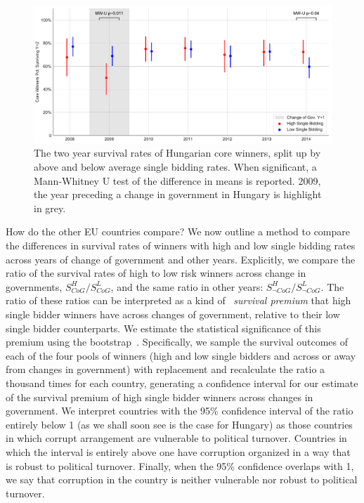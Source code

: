\begin{figure}
\centering
  \includegraphics[width=\textwidth]{images/ted_networks/hu_cog_core.pdf}
  \caption[Hungarian procurement market turnover]{The two year survival rates of Hungarian core winners, split up by above and below average single bidding rates. When significant, a Mann-Whitney U test of the difference in means is reported. 2009, the year preceding a change in government in Hungary is highlight in grey.}
  \label{fig:hu_core_turnover}
\end{figure}

How do the other EU countries compare? We now outline a method to compare the differences in survival rates of winners with high and low single bidding rates across years of change of government and other years. Explicitly, we compare the ratio of the survival rates of high to low risk winners across change in governments, $S_{CoG}^{H}/S_{CoG}^{L}$, and the same ratio in other years: $S_{\lnot CoG}^{H}/S_{\lnot CoG}^{L}$. The ratio of these ratios can be interpreted as a kind of ~\textit{survival premium} that high single bidder winners have across changes of government, relative to their low single bidder counterparts. We estimate the statistical significance of this premium using the bootstrap~\cite{efron1994introduction}. Specifically, we sample the survival outcomes of each of the four pools of winners (high and low single bidders and across or away from changes in government) with replacement and recalculate the ratio a thousand times for each country, generating a confidence interval for our estimate of the survival premium of high single bidder winners across changes in government. We interpret countries with the 95\% confidence interval of the ratio entirely below 1 (as we shall soon see is the case for Hungary) as those countries in which corrupt arrangement are vulnerable to political turnover. Countries in which the interval is entirely above one have corruption organized in a way that is robust to political turnover. Finally, when the 95\% confidence overlaps with 1, we say that corruption in the country is neither vulnerable nor robust to political turnover.

